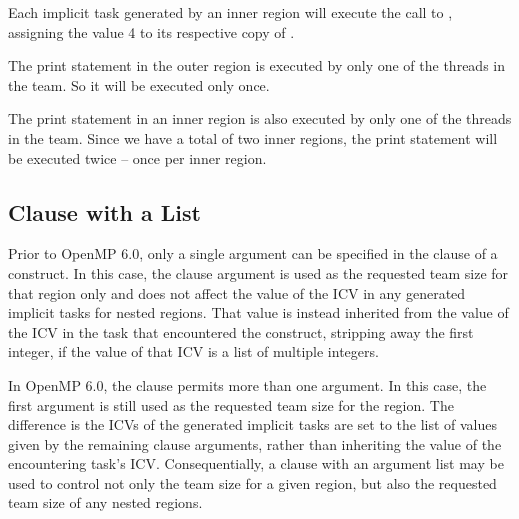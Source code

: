 Each implicit task generated by an inner  region will execute 
the call to , assigning the value 4 to its respective 
copy of .

The print statement in the outer  region is executed by only one 
of the threads in the team. So it will be executed only once.

The print statement in an inner  region is also executed by only 
one of the threads in the team. Since we have a total of two inner  
regions, the print statement will be executed twice -- once per inner  
region.

\pagebreak
{}


\pagebreak
\subsection{ Clause with a List}
\label{subsec:icv_nthreads}

Prior to OpenMP 6.0, only a single argument can be specified in the 
 clause of a  construct. 
In this case, the clause argument is used as the requested team size for 
that  region only and does not affect the value of the
 ICV in any generated implicit tasks for nested 
 regions.
That value is instead inherited from the value of the  
ICV in the task that encountered the  construct, 
stripping away the first integer, if the value of that ICV is a list of 
multiple integers. 

In OpenMP 6.0, the  clause permits more than one argument.
In this case, the first argument is still used as the requested team size for
the  region. The difference is the  ICVs of
the generated implicit tasks are set to the list of values given by the
remaining clause arguments, rather than inheriting the value of the
encountering task's  ICV. Consequentially, a
 clause with an argument list may be used to control not
only the team size for a given  region, but also the 
requested team size of any nested  regions.

